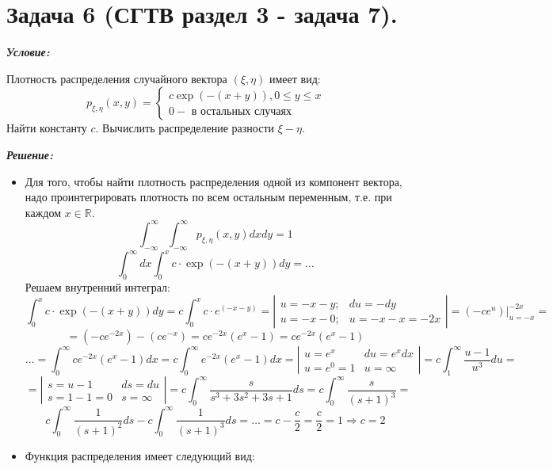 \section*{Задача 6 (СГТВ раздел 3 - задача 7).}

\noindent\textit{\textbf{Условие:}}

Плотность распределения случайного вектора $(\xi, \eta)$ имеет вид:
\[
p_{\xi, \eta} (x, y) =
\begin{cases}
	c \exp (-(x+y)), 0 \le y \le x \\
	0 - \text{ в остальных случаях}
\end{cases}
\]
Найти константу $c$. Вычислить распределение разности $\xi - \eta$.

\noindent\textit{\textbf{Решение:}}

\begin{itemize}
	\item Для того, чтобы найти плотность распределения одной из компонент вектора, надо проинтегрировать плотность по всем остальным переменным, т.е. при каждом $x \in \mathbb{R}$.
	\[ \int_{- \infty}^{\infty} \int_{- \infty}^{\infty} p_{\xi, \eta} (x, y) dxdy = 1 \]
	\[ \int_{0}^{\infty}dx \int_{0}^{x} c \cdot \exp (-(x+y)) dy = \dots \]
	Решаем внутренний интеграл:
	\[ \int_{0}^{x} c \cdot \exp (-(x+y)) dy = c \int_{0}^{x} c \cdot e^(-x-y) = 
	\left| \begin{smallmatrix} u = -x-y; & du = -dy \\ u = -x-0; & u = -x-x=-2x \end{smallmatrix} \right| = 
	(-ce^u) \bigg|_{u=-x}^{-2x} = \]
	\[ = (-ce^{-2x})-(ce^{-x})=ce^{-2x}(e^x-1) = ce^{-2x}(e^x-1) \]
	\[ \dots = \int_{0}^{\infty} ce^{-2x}(e^x-1) dx = c \int_{0}^{\infty} e^{-2x}(e^x-1) dx = 
	\left| \begin{smallmatrix} u = e^x & du = e^xdx \\ u = e^0 = 1 & u = \infty \end{smallmatrix} \right| =
	c \int_{1}^{\infty} \frac{u-1}{u^3} du =\]
	\[ = \left| \begin{smallmatrix} s = u-1 & ds = du \\ s = 1-1=0 & s = \infty \end{smallmatrix} \right| =
	c \int_{0}^{\infty} \frac{s}{s^3 + 3s^2 + 3s + 1}ds = c \int_{0}^{\infty} \frac{s}{(s+1)^3} = 
	 \]
	 \[ c \int_{0}^{\infty} \frac{1}{(s+1)^2} ds - c \int_{0}^{\infty} \frac{1}{(s+1)^3} ds = \dots = c - \frac{c}{2} = \frac{c}{2} = 1 \Rightarrow c = 2 \]
	 \item Функция распределения имеет следующий вид:

\end{itemize}
